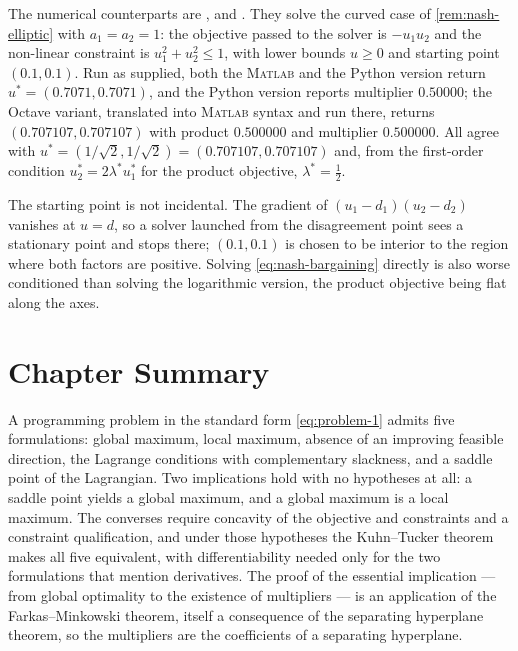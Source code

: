 The numerical counterparts are ,
 and 
\autocite[slides 41--44]{fukuda2026optimization}. They solve the curved case of
\autoref{rem:nash-elliptic} with $a_1=a_2=1$: the objective passed to the solver
is $-u_1u_2$ and the non-linear constraint is $u_1^2+u_2^2\leq1$, with lower
bounds $u\geq0$ and starting point $(0.1,0.1)$. Run as supplied, both the
\textsc{Matlab} and the Python version return $u^\ast=(0.7071,0.7071)$, and the
Python version reports multiplier $0.50000$; the Octave variant, translated into
\textsc{Matlab} syntax and run there, returns $(0.707107,0.707107)$ with product
$0.500000$ and multiplier $0.500000$. All agree with
$u^\ast=(1/\sqrt2,1/\sqrt2)=(0.707107,0.707107)$ and, from the first-order
condition $u_2^\ast=2\lambda^\ast u_1^\ast$ for the product objective,
$\lambda^\ast=\tfrac12$.

The starting point is not incidental. The gradient of $(u_1-d_1)(u_2-d_2)$
vanishes at $u=d$, so a solver launched from the disagreement point sees a
stationary point and stops there; $(0.1,0.1)$ is chosen to be interior to the
region where both factors are positive. Solving \eqref{eq:nash-bargaining}
directly is also worse conditioned than solving the logarithmic version, the
product objective being flat along the axes.

\section{Chapter Summary}\label{sec:opt-summary}

A programming problem in the standard form \eqref{eq:problem-1} admits five
formulations: global maximum, local maximum, absence of an improving feasible
direction, the Lagrange conditions with complementary slackness, and a saddle
point of the Lagrangian. Two implications hold with no hypotheses at all: a
saddle point yields a global maximum, and a global maximum is a local maximum.
The converses require concavity of the objective and constraints and a constraint
qualification, and under those hypotheses the Kuhn--Tucker theorem makes all five
equivalent, with differentiability needed only for the two formulations that
mention derivatives. The proof of the essential implication --- from global
optimality to the existence of multipliers --- is an application of the
Farkas--Minkowski theorem, itself a consequence of the separating hyperplane
theorem, so the multipliers are the coefficients of a separating hyperplane.

